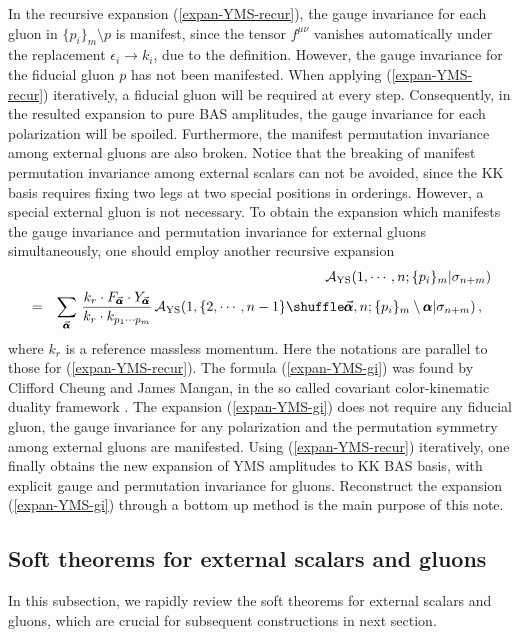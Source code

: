 \documentclass[preprint,showpacs,onecolumn,nofootinbib]{revtex4}
\newcommand{\bea}{\begin{eqnarray}}
\newcommand{\eea}{\end{eqnarray}}
\newcommand{\nn}{\nonumber \\}
\def\eref#1{(\ref{#1})}
\def\a{{\alpha}}
\begin{document}
In the recursive expansion \eref{expan-YMS-recur}, the gauge invariance for each gluon in $\{p_i\}_m\setminus p$ is manifest, since the tensor $f^{\mu\nu}$ vanishes automatically under the replacement $\epsilon_i\to k_i$, due to the definition. However, the gauge invariance for the fiducial gluon $p$ has not been manifested. When applying \eref{expan-YMS-recur} iteratively, a fiducial gluon will be required at every step. Consequently, in the resulted expansion to pure BAS amplitudes, the gauge invariance for each polarization will be spoiled. Furthermore, the manifest permutation invariance among external gluons are also broken. Notice that the breaking of manifest permutation invariance among external scalars can not be avoided, since the KK basis requires fixing two legs at two special positions in orderings. However, a special external gluon is not necessary. To obtain the expansion which manifests the gauge invariance and permutation invariance for external gluons simultaneously, one should employ another recursive expansion
%
\bea
& &{\cal A}_{\rm YS}(1,\cdots,n;\{p_i\}_m|\sigma_{n+m})\nn
&=&\sum_{\vec{\pmb{\a}}}\,{k_r\cdot F_{\vec{\pmb{\a}}}\cdot Y_{\vec{\pmb{\a}}}\over k_r\cdot k_{p_1\cdots p_m}}\,{\cal A}_{\rm YS}(1,\{2,\cdots,n-1\}\shuffle \vec{\pmb{\a}},n;\{p_i\}_m\setminus\pmb{\a}|\sigma_{n+m})\,,~~\label{expan-YMS-gi}
\eea
%
where $k_r$ is a reference massless momentum. Here the notations are parallel to those for \eref{expan-YMS-recur}. The formula \eref{expan-YMS-gi} was found by Clifford Cheung and James Mangan, in the so called covariant color-kinematic duality framework \cite{Cheung:2021zvb}. The expansion \eref{expan-YMS-gi} does not require any fiducial gluon, the gauge invariance for any polarization and the permutation symmetry among external gluons are manifested. Using \eref{expan-YMS-recur} iteratively, one finally obtains the new expansion of YMS amplitudes to KK BAS basis, with explicit gauge and permutation invariance for gluons. Reconstruct the expansion \eref{expan-YMS-gi} through a bottom up method is the main purpose of this note.

\subsection{Soft theorems for external scalars and gluons}
\label{subsec-soft}

In this subsection, we rapidly review the soft theorems for external scalars and gluons, which are crucial for subsequent constructions in next section.
\end{document}
